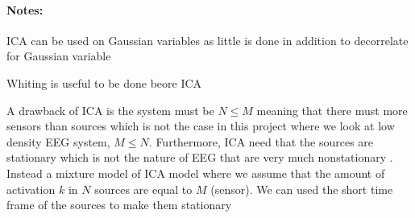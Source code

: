 \paragraph{Notes:}
ICA can be used on Gaussian variables as little is done in addition to decorrelate for Gaussian variable

Whiting is useful to be done beore ICA

A drawback of ICA is the system must be $N \leq M$ meaning that there must more sensors than sources which is not the case in this project where we look at low density EEG system, $M \leq N$. Furthermore, ICA need that the sources are stationary which is not the nature of EEG that are very much nonstationary \cite[p. 7-8]{PHD}.
\\
Instead a mixture model of ICA model where we assume that the amount of activation $k$ in $N$ sources are equal to $M$ (sensor). We can used the short time frame of the sources to make them stationary
